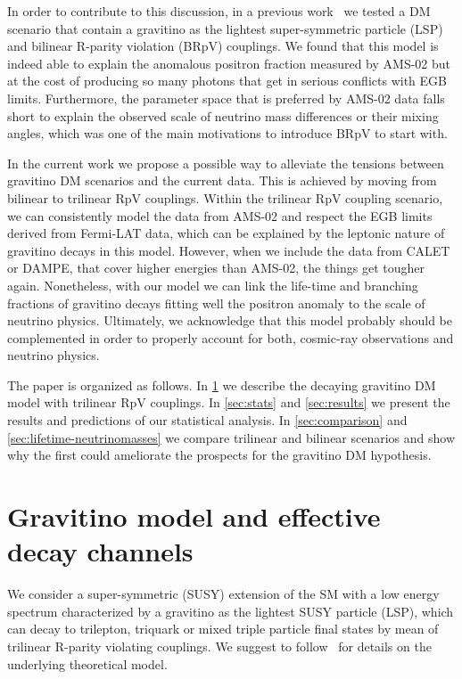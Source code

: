 \documentclass[a4paper,11pt]{article}
\begin{document}
In order to contribute to this discussion, in a previous work~\cite{Carquin:2015uma} we tested a DM scenario that contain a gravitino as the lightest super-symmetric particle (LSP) and bilinear R-parity violation (BRpV) couplings. We found that this model is indeed able to explain the anomalous positron fraction measured by AMS-02 but at the cost of producing so many photons that get in serious conflicts with EGB limits. Furthermore, the parameter space that is preferred by AMS-02 data falls short to explain the observed scale of neutrino mass differences or their mixing angles, which was one of the main motivations to introduce BRpV to start with.

In the current work we propose a possible way to alleviate the tensions between gravitino DM scenarios and the current data. This is achieved by moving from bilinear to trilinear RpV couplings. Within the trilinear RpV coupling scenario, we can consistently model the data from AMS-02 and respect the EGB limits derived from Fermi-LAT data, which can be explained by the leptonic nature of gravitino decays in this model. However, when we include the data from CALET or DAMPE, that cover higher energies than AMS-02, the things get tougher again. Nonetheless, with our model we can link the life-time and branching fractions of gravitino decays fitting well the positron anomaly to the scale of neutrino physics. Ultimately, we acknowledge that this model probably should be complemented in order to properly account for both, cosmic-ray observations and neutrino physics.

The paper is organized as follows. In \cref{gdecay} we describe the decaying gravitino DM model with trilinear RpV couplings. In \cref{sec:stats} and \cref{sec:results} we present the results and predictions of our statistical analysis. In \cref{sec:comparison} and \cref{sec:lifetime-neutrinomasses} we compare trilinear and bilinear scenarios and show why the first could ameliorate the prospects for the gravitino DM hypothesis. 

 
\section{Gravitino model and effective decay channels}
\label{gdecay}

We consider a super-symmetric (SUSY) extension of the SM with a low energy spectrum characterized by a gravitino as the lightest SUSY particle (LSP), which can decay to trilepton, triquark or mixed triple particle final states by mean of trilinear R-parity violating couplings. We suggest to follow~\cite{Grefe:2011dp, Moreau:2001sr} for details on the underlying theoretical model. 
\end{document}
